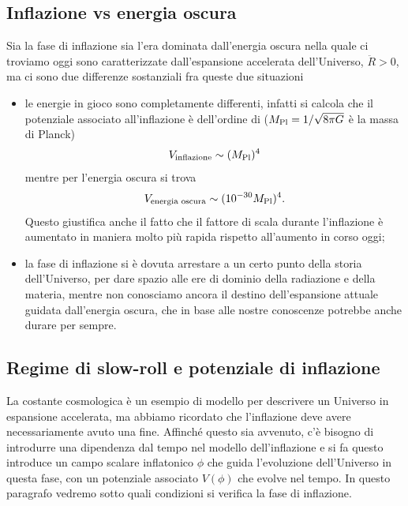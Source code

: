 \subsection{Inflazione vs energia oscura}
\label{sec:inflazione-energia-oscura}

Sia la fase di inflazione sia l'era dominata dall'energia oscura nella quale ci
troviamo oggi sono caratterizzate dall'espansione accelerata dell'Universo,
\(\ddot{R} > 0\), ma ci sono due differenze sostanziali fra queste due
situazioni
\begin{itemize}
\item le energie in gioco sono completamente differenti, infatti si calcola che
  il potenziale associato all'inflazione è dell'ordine di (\(M_{\textup{Pl}} =
  1/\sqrt{8\pi G}\) è la massa di Planck)
  \begin{equation}
    V_{\textup{inflazione}} \sim (M_{\textup{Pl}})^{4}
  \end{equation}
  mentre per l'energia oscura si trova
  \begin{equation}
    V_{\textup{energia oscura}} \sim (10^{-30}M_{\textup{Pl}})^{4}.
  \end{equation}
  Questo giustifica anche il fatto che il fattore di scala durante l'inflazione
  è aumentato in maniera molto più rapida rispetto all'aumento in corso oggi;
\item la fase di inflazione si è dovuta arrestare a un certo punto della storia
  dell'Universo, per dare spazio alle ere di dominio della radiazione e della
  materia, mentre non conosciamo ancora il destino dell'espansione attuale
  guidata dall'energia oscura, che in base alle nostre conoscenze potrebbe anche
  durare per sempre.
\end{itemize}

\subsection{Regime di slow-roll e potenziale di inflazione}
\label{sec:slow-roll}

La costante cosmologica è un esempio di modello per descrivere un Universo in
espansione accelerata, ma abbiamo ricordato che l'inflazione deve avere
necessariamente avuto una fine.  Affinché questo sia avvenuto, c'è bisogno di
introdurre una dipendenza dal tempo nel modello dell'inflazione e si fa questo
introduce un campo scalare inflatonico \(\phi\) che guida l'evoluzione
dell'Universo in questa fase, con un potenziale associato \(V(\phi)\) che evolve
nel tempo.  In questo paragrafo vedremo sotto quali condizioni si verifica la
fase di inflazione.

